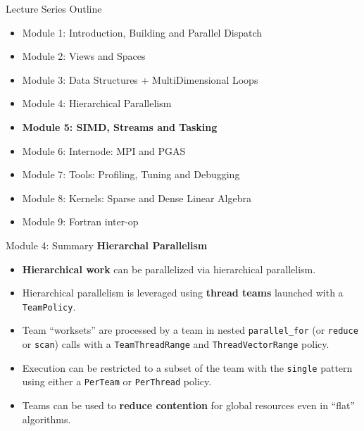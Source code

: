 \begin{frame}[fragile]{Lecture Series Outline}

\begin{itemize}
        \item Module 1: Introduction, Building and Parallel Dispatch
        \item Module 2: Views and Spaces
        \item Module 3: Data Structures + MultiDimensional Loops
        \item Module 4: Hierarchical Parallelism
        \item \textbf{Module 5: SIMD, Streams and Tasking}
        \item Module 6: Internode: MPI and PGAS
        \item Module 7: Tools: Profiling, Tuning and Debugging
        \item Module 8: Kernels: Sparse and Dense Linear Algebra
        \item Module 9: Fortran inter-op
\end{itemize}

\end{frame}



\begin{frame}[fragile]{Module 4: Summary}
	\textbf{Hierarchal Parallelism}
  \begin{itemize}
    \item{\textbf{Hierarchical work} can be parallelized via hierarchical parallelism.}
    \item{Hierarchical parallelism is leveraged using \textbf{thread teams} launched with a \texttt{TeamPolicy}.}
    \item{Team ``worksets'' are processed by a team in nested \texttt{parallel\_for} (or \texttt{reduce} or \texttt{scan}) calls with a \texttt{TeamThreadRange} and \texttt{ThreadVectorRange} policy.}
    \item{Execution can be restricted to a subset of the team with the \texttt{single} pattern using either a \texttt{PerTeam} or \texttt{PerThread} policy.}
    \item{Teams can be used to \textbf{reduce contention} for global resources even in ``flat'' algorithms.}
  \end{itemize}


  
\end{frame}

